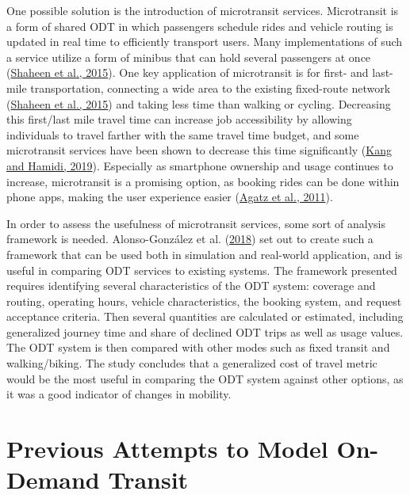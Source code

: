 \documentclass[
]{report}
\begin{document}
One possible solution is the introduction of microtransit services. Microtransit is a form of shared ODT in which passengers schedule rides and vehicle routing is updated in real time to efficiently transport users. Many implementations of such a service utilize a form of minibus that can hold several passengers at once (\protect\hyperlink{ref-Shaheen2015}{Shaheen et al., 2015}). One key application of microtransit is for first- and last-mile transportation, connecting a wide area to the existing fixed-route network (\protect\hyperlink{ref-Shaheen2015}{Shaheen et al., 2015}) and taking less time than walking or cycling. Decreasing this first/last mile travel time can increase job accessibility by allowing individuals to travel farther with the same travel time budget, and some microtransit services have been shown to decrease this time significantly (\protect\hyperlink{ref-Kang2019}{Kang and Hamidi, 2019}). Especially as smartphone ownership and usage continues to increase, microtransit is a promising option, as booking rides can be done within phone apps, making the user experience easier (\protect\hyperlink{ref-Agatz2011}{Agatz et al., 2011}).

In order to assess the usefulness of microtransit services, some sort of analysis framework is needed. Alonso-González et al. (\protect\hyperlink{ref-Alonso-Gonzalez2018}{2018}) set out to create such a framework that can be used both in simulation and real-world application, and is useful in comparing ODT services to existing systems. The framework presented requires identifying several characteristics of the ODT system: coverage and routing, operating hours, vehicle characteristics, the booking system, and request acceptance criteria. Then several quantities are calculated or estimated, including generalized journey time and share of declined ODT trips as well as usage values. The ODT system is then compared with other modes such as fixed transit and walking/biking. The study concludes that a generalized cost of travel metric would be the most useful in comparing the ODT system against other options, as it was a good indicator of changes in mobility.

\hypertarget{previous-attempts-to-model-on-demand-transit}{%
\section{Previous Attempts to Model On-Demand Transit}\label{previous-attempts-to-model-on-demand-transit}}
\end{document}
